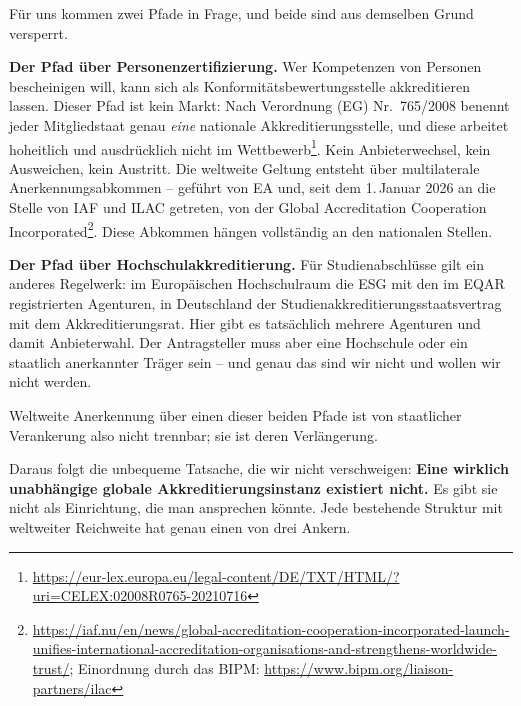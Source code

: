\documentclass[11pt,a4paper]{article}
\begin{document}
Für uns kommen zwei Pfade in Frage, und beide sind aus demselben Grund versperrt.

\textbf{Der Pfad über Personenzertifizierung.} Wer Kompetenzen von Personen bescheinigen will, kann sich als Konformitätsbewertungsstelle akkreditieren lassen. Dieser Pfad ist kein Markt: Nach Verordnung (EG) Nr.~765/2008 benennt jeder Mitgliedstaat genau \textit{eine} nationale Akkreditierungsstelle, und diese arbeitet hoheitlich und ausdrücklich nicht im Wettbewerb\footnote{\url{https://eur-lex.europa.eu/legal-content/DE/TXT/HTML/?uri=CELEX:02008R0765-20210716}}. Kein Anbieterwechsel, kein Ausweichen, kein Austritt. Die weltweite Geltung entsteht über multilaterale Anerkennungsabkommen -- geführt von EA und, seit dem 1.\,Januar 2026 an die Stelle von IAF und ILAC getreten, von der Global Accreditation Cooperation Incorporated\footnote{\url{https://iaf.nu/en/news/global-accreditation-cooperation-incorporated-launch-unifies-international-accreditation-organisations-and-strengthens-worldwide-trust/}; Einordnung durch das BIPM: \url{https://www.bipm.org/liaison-partners/ilac}}. Diese Abkommen hängen vollständig an den nationalen Stellen.

\textbf{Der Pfad über Hochschulakkreditierung.} Für Studienabschlüsse gilt ein anderes Regelwerk: im Europäischen Hochschulraum die ESG mit den im EQAR registrierten Agenturen, in Deutschland der Studienakkreditierungsstaatsvertrag mit dem Akkreditierungsrat. Hier gibt es tatsächlich mehrere Agenturen und damit Anbieterwahl. Der Antragsteller muss aber eine Hochschule oder ein staatlich anerkannter Träger sein -- und genau das sind wir nicht und wollen wir nicht werden.

Weltweite Anerkennung über einen dieser beiden Pfade ist von staatlicher Verankerung also nicht trennbar; sie ist deren Verlängerung.

Daraus folgt die unbequeme Tatsache, die wir nicht verschweigen: \textbf{Eine wirklich unabhängige globale Akkreditierungsinstanz existiert nicht.} Es gibt sie nicht als Einrichtung, die man ansprechen könnte. Jede bestehende Struktur mit weltweiter Reichweite hat genau einen von drei Ankern.
\end{document}

